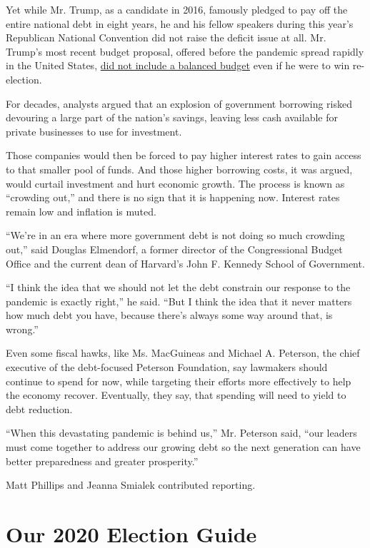 Yet while Mr. Trump, as a candidate in 2016, famously pledged to pay off
the entire national debt in eight years, he and his fellow speakers
during this year's Republican National Convention did not raise the
deficit issue at all. Mr. Trump's most recent budget proposal, offered
before the pandemic spread rapidly in the United States,
\href{https://www.nytimes3xbfgragh.onion/2020/02/10/business/economy/trump-budget.html}{did
not include a balanced budget} even if he were to win re-election.

For decades, analysts argued that an explosion of government borrowing
risked devouring a large part of the nation's savings, leaving less cash
available for private businesses to use for investment.

Those companies would then be forced to pay higher interest rates to
gain access to that smaller pool of funds. And those higher borrowing
costs, it was argued, would curtail investment and hurt economic growth.
The process is known as ``crowding out,'' and there is no sign that it
is happening now. Interest rates remain low and inflation is muted.

``We're in an era where more government debt is not doing so much
crowding out,'' said Douglas Elmendorf, a former director of the
Congressional Budget Office and the current dean of Harvard's John F.
Kennedy School of Government.

``I think the idea that we should not let the debt constrain our
response to the pandemic is exactly right,'' he said. ``But I think the
idea that it never matters how much debt you have, because there's
always some way around that, is wrong.''

Even some fiscal hawks, like Ms. MacGuineas and Michael A. Peterson, the
chief executive of the debt-focused Peterson Foundation, say lawmakers
should continue to spend for now, while targeting their efforts more
effectively to help the economy recover. Eventually, they say, that
spending will need to yield to debt reduction.

``When this devastating pandemic is behind us,'' Mr. Peterson said,
``our leaders must come together to address our growing debt so the next
generation can have better preparedness and greater prosperity.''

Matt Phillips and Jeanna Smialek contributed reporting.

\hypertarget{our-2020-election-guide}{%
\section{Our 2020 Election Guide}\label{our-2020-election-guide}}

